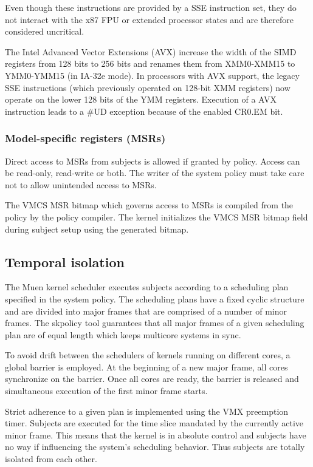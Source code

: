 Even though these instructions are provided by a SSE instruction set, they do
not interact with the x87 FPU or extended processor states and are therefore
considered uncritical.

The Intel Advanced Vector Extensions (AVX) increase the width of the
SIMD registers from 128 bits to 256 bits and renames them from XMM0-XMM15 to
YMM0-YMM15 (in IA-32e mode). In processors with AVX support, the legacy SSE
instructions (which previously operated on 128-bit XMM registers) now operate on
the lower 128 bits of the YMM registers. Execution of a AVX instruction leads to
a \#UD exception because of the enabled CR0.EM bit.

\subsubsection{Model-specific registers (MSRs)}
Direct access to MSRs from subjects is allowed if granted by policy. Access can
be read-only, read-write or both. The writer of the system policy must take care
not to allow unintended access to MSRs.

The VMCS MSR bitmap which governs access to MSRs is compiled from the policy by
the policy compiler. The kernel initializes the VMCS MSR bitmap field during
subject setup using the generated bitmap.

\subsection{Temporal isolation}
The Muen kernel scheduler executes subjects according to a scheduling plan
specified in the system policy. The scheduling plans have a fixed cyclic
structure and are divided into major frames that are comprised of a number of
minor frames. The skpolicy tool guarantees that all major frames of a given
scheduling plan are of equal length which keeps multicore systems in sync.

To avoid drift between the schedulers of kernels running on different cores, a
global barrier is employed. At the beginning of a new major frame, all cores
synchronize on the barrier. Once all cores are ready, the barrier is released
and simultaneous execution of the first minor frame starts.

Strict adherence to a given plan is implemented using the VMX preemption timer.
Subjects are executed for the time slice mandated by the currently active minor
frame. This means that the kernel is in absolute control and subjects have no
way if influencing the system's scheduling behavior. Thus subjects are totally
isolated from each other.

